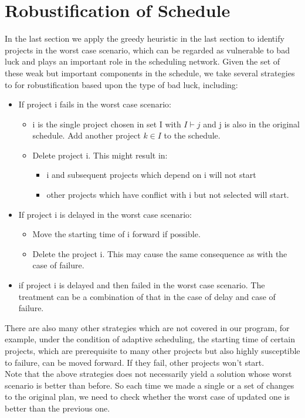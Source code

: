 \documentclass[final,3p,times]{elsarticle}
\begin{document}
\section{Robustification of Schedule}
In the last section we apply the greedy heuristic in the last section to identify projects in the worst case scenario, which can be regarded as vulnerable to bad luck and plays an important role in the scheduling network. Given the set of these weak but important components in the schedule, we take several strategies to for robustification based upon the type of bad luck, including:
\begin{itemize}
	\item If project i fails in the worst case scenario:
	\begin{itemize}
		\item i is the single project chosen in set I with $I\vdash j$ and j is also in the original schedule. Add another project $k\in I$ to the schedule. 
		\item Delete project i. This might result in:
		\begin{itemize}
			\item i and subsequent projects which depend on i will not start
			\item other projects which have conflict with i but not selected will start.
		\end{itemize}
	\end{itemize}
	\item If project i is delayed in the worst case scenario:
	\begin{itemize}
		\item Move the starting time of i forward if possible.
		\item Delete the project i. This may cause the same consequence as with the case of failure.
	\end{itemize}
	\item if project i is delayed and then failed in the worst case scenario. The treatment can be a combination of that in the case of delay and case of failure.
\end{itemize}
There are also many other strategies which are not covered in our program, for example, under the condition of adaptive scheduling, the starting time of certain projects, which are prerequisite to many other projects but also highly susceptible to failure, can be moved forward. If they fail, other projects won't start.\\

Note that the above strategies does not necessarily yield a solution whose worst scenario is better than before. So each time we made a single or a set of changes to the original plan, we need to check whether the worst case of updated one is better than the previous one.
\end{document}
